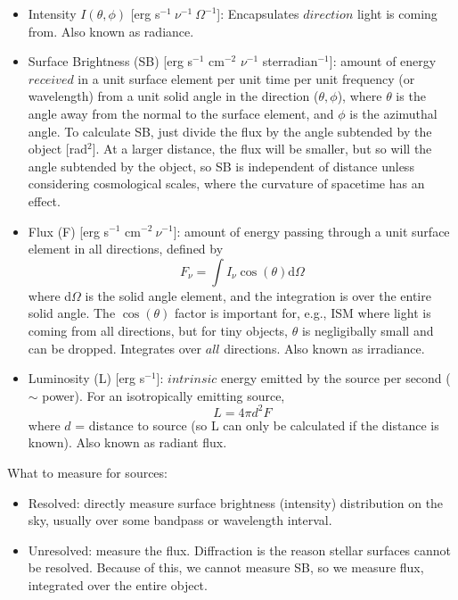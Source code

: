\documentclass[12pt]{article}
\begin{document}
\begin{itemize}
    \item Intensity $I(\theta,\phi)$ [erg s$^{-1}\ \nu^{-1}\ \Omega^{-1}$]:
        Encapsulates $direction$ light is coming from.
        Also known as radiance.
    \item Surface Brightness (SB)
        [erg s$^{-1}$ cm$^{-2}$ $\nu^{-1}$ sterradian$^{-1}$]:
        amount of energy $received$ in a unit surface
        element per unit time per unit frequency (or wavelength) from a unit
        solid angle in the direction ($\theta,\phi$), where $\theta$ is the angle
        away from the normal to the surface element, and $\phi$ is the azimuthal
        angle.
        To calculate SB, just divide the flux by the angle subtended
        by the object [rad$^2$]. At a larger distance, the flux will
        be smaller, but so will the angle subtended by the object, so
        SB is independent of distance unless considering cosmological
        scales, where the curvature of spacetime has an effect.
    \item Flux (F) [erg s$^{-1}$ cm$^{-2}\ \nu^{-1}$]:
        amount of energy passing through a unit surface element
        in all directions, defined by
        \begin{equation}
            F_{\nu} = \int I_{\nu}\cos(\theta)\textrm{d}\Omega
        \end{equation}
        where d$\Omega$ is the solid angle element, and the integration is
        over the entire solid angle. The $\cos(\theta)$ factor is important
        for, e.g., ISM where light is coming from all directions, but for
        tiny objects, $\theta$ is negligibally small and can be dropped.
        Integrates over $all$ directions.
        Also known as irradiance.
    \item Luminosity (L) [erg s$^{-1}$]:
        $intrinsic$ energy emitted by the source per
        second ($\sim$ power). For an isotropically emitting source,
        \begin{equation}
            L = 4 \pi d^2 F
        \end{equation}
        where $d$ = distance to source (so L can only be calculated if
        the distance is known). Also known as radiant flux.
\end{itemize}
What to measure for sources:
\begin{itemize}
    \item Resolved: directly measure surface brightness (intensity)
        distribution on the sky, usually over some bandpass or wavelength
        interval.
    \item Unresolved: measure the flux. Diffraction is the reason stellar
        surfaces cannot be resolved. Because of this, we cannot measure
        SB, so we measure flux, integrated over the entire object.
\end{itemize}
\end{document}
